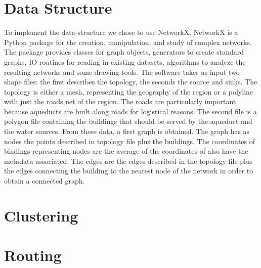 \section{Data Structure}
\label{data_structure_technical}
To implement the data-structure we chose to use NetworkX. NetworkX is a Python package
for the creation, manipulation, and study of complex networks. The package provides
classes for graph objects, generators to create standard graphs, IO routines for reading in
existing datasets, algorithms to analyze the resulting networks and some drawing tools.
The software takes as input two shape files: the first describes the topology, the seconds
the source and sinks. The topology is either a mesh, representing the geography of the
region or a polyline with just the roads net of the region. The roads are particularly
important because aqueducts are built along roads for logistical reasons. The second file
is a polygon file containing the buildings that should be served by the aqueduct and the
water sources.
From these data, a first graph is obtained. The graph has as nodes the points described
in topology file plus the buildings. The coordinates of bindings-representing nodes are the
average of the coordinates of also have the metadata associated. The edges are the edges
described in the topology file plus the edges connecting the building to the nearest node
of the network in order to obtain a connected graph.

\section{Clustering} 
\label{Clustering_thecnical}

\section{Routing}
\label{Routing_thecnical}